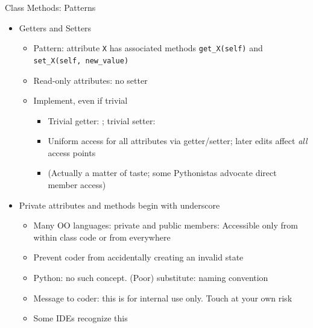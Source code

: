 \begin{frame}{Class Methods: Patterns}
%
\begin{itemize}
\item Getters and Setters
	\begin{itemize}
	\item Pattern: attribute \texttt{X} has associated methods \texttt{get\_X(self)} and \\
		\texttt{set\_X(self, new\_value)}
	\item Read-only attributes: no setter
	\item Implement, even if trivial
		\begin{itemize}
		\item Trivial getter: ; trivial setter: 
		\item[\Thus] Uniform access for all attributes via getter/setter; later edits affect \emph{all} access points
		\item (Actually a matter of taste; some Pythonistas advocate direct member access)
		\end{itemize}
	\end{itemize}
\item Private attributes and methods begin with underscore
	\begin{itemize}
	\item Many OO languages: private and public members: Accessible only from within class code or from everywhere
	\item[\Thus] Prevent coder from accidentally creating an invalid state
	\item Python: no such concept. (Poor) substitute: naming convention
	\item Message to coder: this is for internal use only. Touch at your own risk
	\item Some IDEs recognize this
	\end{itemize}
\end{itemize}
%
\end{frame}


